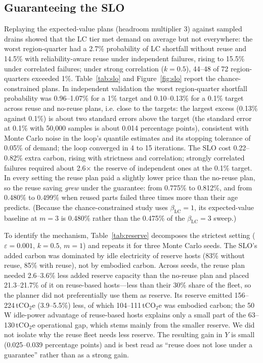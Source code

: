 \documentclass[11pt]{article}
\begin{document}
\subsection{Guaranteeing the SLO}
Replaying the expected-value plans (headroom multiplier 3) against sampled drains showed that the LC tier met demand on average but not everywhere: the worst region-quarter had a 2.7\% probability of LC shortfall without reuse and 14.5\% with reliability-aware reuse under independent failures, rising to 15.5\% under correlated failures; under strong correlation ($k=0.5$), 44--48 of 72 region-quarters exceeded 1\%. Table~\ref{tab:slo} and Figure~\ref{fig:slo} report the chance-constrained plans. In independent validation the worst region-quarter shortfall probability was 0.96--1.07\% for a 1\% target and 0.10--0.13\% for a 0.1\% target across reuse and no-reuse plans, i.e. close to the targets: the largest excess (0.13\% against 0.1\%) is about two standard errors above the target (the standard error at 0.1\% with 50{,}000 samples is about 0.014 percentage points), consistent with Monte Carlo noise in the loop's quantile estimates and its stopping tolerance of 0.05\% of demand; the loop converged in 4 to 15 iterations. The SLO cost 0.22--0.82\% extra carbon, rising with strictness and correlation; strongly correlated failures required about 2.6$\times$ the reserve of independent ones at the 0.1\% target. In every setting the reuse plan paid a slightly lower price than the no-reuse plan, so the reuse saving \emph{grew} under the guarantee: from 0.775\% to 0.812\%, and from 0.480\% to 0.499\% when reused parts failed three times more than their age predicts. (Because the chance-constrained study uses $\beta_{\text{LC}}=1$, its expected-value baseline at $m=3$ is 0.480\% rather than the 0.475\% of the $\beta_{\text{LC}}=3$ sweep.)

To identify the mechanism, Table~\ref{tab:reserve} decomposes the strictest setting ($\varepsilon=0.001$, $k=0.5$, $m=1$) and repeats it for three Monte Carlo seeds. The SLO's added carbon was dominated by idle electricity of reserve hosts (83\% without reuse, 85\% with reuse), not by embodied carbon. Across seeds, the reuse plan needed 2.6--3.6\% less added reserve capacity than the no-reuse plan and placed 21.3--21.7\% of it on reuse-based hosts---less than their 30\% share of the fleet, so the planner did not preferentially use them as reserve. Its reserve emitted 156--224\,tCO$_2$e (3.9--5.5\%) less, of which 104--111\,tCO$_2$e was embodied carbon; the 50\,W idle-power advantage of reuse-based hosts explains only a small part of the 63--130\,tCO$_2$e operational gap, which stems mainly from the smaller reserve. We did not isolate why the reuse fleet needs less reserve. The resulting gain in $Y$ is small (0.025--0.039 percentage points) and is best read as ``reuse does not lose under a guarantee'' rather than as a strong gain.
\end{document}
